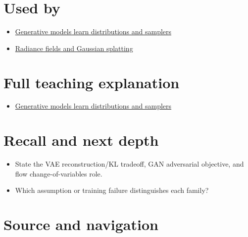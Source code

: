 \section{Used by}\label{appendix-2c568f05ee34-used-by}

\begin{itemize}
\tightlist
\item
  \href{Continuous\%20Notes/University\%20-\%20Worlds,\%20Images\%20and\%20Inference\%20-\%20Graphics,\%20Vision\%20and\%20Photography\#Generative\%20models\%20learn\%20distributions\%20and\%20samplers}{Generative models learn distributions and samplers}
\item
  \hyperref[appendix-c5b332e400e7]{Radiance fields and Gaussian splatting}
\end{itemize}

\section{Full teaching explanation}\label{appendix-2c568f05ee34-full-teaching-explanation}

\begin{itemize}
\tightlist
\item
  \href{Continuous\%20Notes/University\%20-\%20Worlds,\%20Images\%20and\%20Inference\%20-\%20Graphics,\%20Vision\%20and\%20Photography\#Generative\%20models\%20learn\%20distributions\%20and\%20samplers}{Generative models learn distributions and samplers}
\end{itemize}

\section{Recall and next depth}\label{appendix-2c568f05ee34-recall-and-next-depth}

\begin{itemize}
\tightlist
\item
  State the VAE reconstruction/KL tradeoff, GAN adversarial objective, and flow change-of-variables role.
\item
  Which assumption or training failure distinguishes each family?
\end{itemize}

\section{Source and navigation}\label{appendix-2c568f05ee34-source-and-navigation}

